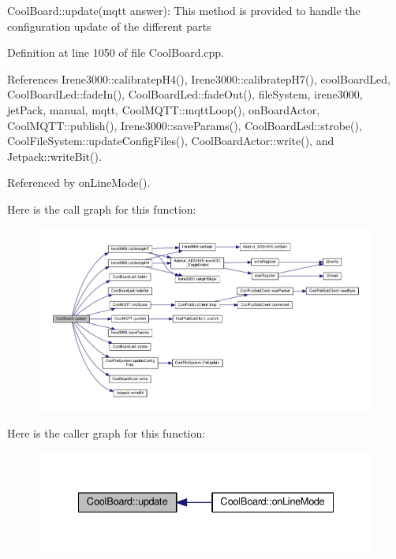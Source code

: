 Cool\+Board\+::update(mqtt answer)\+: This method is provided to handle the configuration update of the different parts 

Definition at line 1050 of file Cool\+Board.\+cpp.



References Irene3000\+::calibratep\+H4(), Irene3000\+::calibratep\+H7(), cool\+Board\+Led, Cool\+Board\+Led\+::fade\+In(), Cool\+Board\+Led\+::fade\+Out(), file\+System, irene3000, jet\+Pack, manual, mqtt, Cool\+M\+Q\+T\+T\+::mqtt\+Loop(), on\+Board\+Actor, Cool\+M\+Q\+T\+T\+::publish(), Irene3000\+::save\+Params(), Cool\+Board\+Led\+::strobe(), Cool\+File\+System\+::update\+Config\+Files(), Cool\+Board\+Actor\+::write(), and Jetpack\+::write\+Bit().



Referenced by on\+Line\+Mode().

Here is the call graph for this function\+:\nopagebreak
\begin{figure}[H]
\begin{center}
\leavevmode
\includegraphics[width=350pt]{d7/df9/class_cool_board_a8612756d3f73198cdde857a66f0fe690_cgraph}
\end{center}
\end{figure}
Here is the caller graph for this function\+:\nopagebreak
\begin{figure}[H]
\begin{center}
\leavevmode
\includegraphics[width=335pt]{d7/df9/class_cool_board_a8612756d3f73198cdde857a66f0fe690_icgraph}
\end{center}
\end{figure}
\mbox{\label{class_cool_board_ae6b5e1274d760462290192acea4adca8}} 

